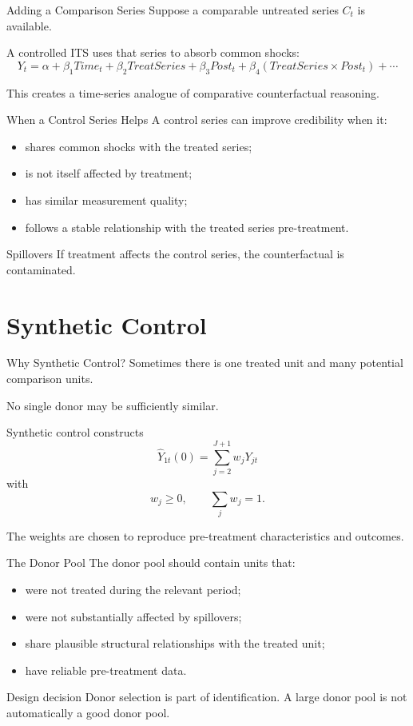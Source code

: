 \documentclass[aspectratio=169,11pt]{beamer}
\begin{document}
\begin{frame}{Adding a Comparison Series}
Suppose a comparable untreated series \(C_t\) is available.

A controlled ITS uses that series to absorb common shocks:
\[
Y_t
=
\alpha
+
\beta_1 Time_t
+
\beta_2 TreatSeries
+
\beta_3 Post_t
+
\beta_4(TreatSeries\times Post_t)
+
\cdots
\]

This creates a time-series analogue of comparative counterfactual reasoning.
\end{frame}

\begin{frame}{When a Control Series Helps}
A control series can improve credibility when it:
\begin{itemize}
\item shares common shocks with the treated series;
\item is not itself affected by treatment;
\item has similar measurement quality;
\item follows a stable relationship with the treated series pre-treatment.
\end{itemize}

\begin{alertblock}{Spillovers}
If treatment affects the control series, the counterfactual is contaminated.
\end{alertblock}
\end{frame}

\section{Synthetic Control}

\begin{frame}{Why Synthetic Control?}
Sometimes there is one treated unit and many potential comparison units.

No single donor may be sufficiently similar.

Synthetic control constructs
\[
\widehat Y_{1t}(0)
=
\sum_{j=2}^{J+1}w_jY_{jt}
\]
with
\[
w_j\geq 0,
\qquad
\sum_jw_j=1.
\]

The weights are chosen to reproduce pre-treatment characteristics and outcomes.
\end{frame}

\begin{frame}{The Donor Pool}
The donor pool should contain units that:
\begin{itemize}
\item were not treated during the relevant period;
\item were not substantially affected by spillovers;
\item share plausible structural relationships with the treated unit;
\item have reliable pre-treatment data.
\end{itemize}

\begin{alertblock}{Design decision}
Donor selection is part of identification. A large donor pool is not automatically a good donor pool.
\end{alertblock}
\end{frame}
\end{document}
